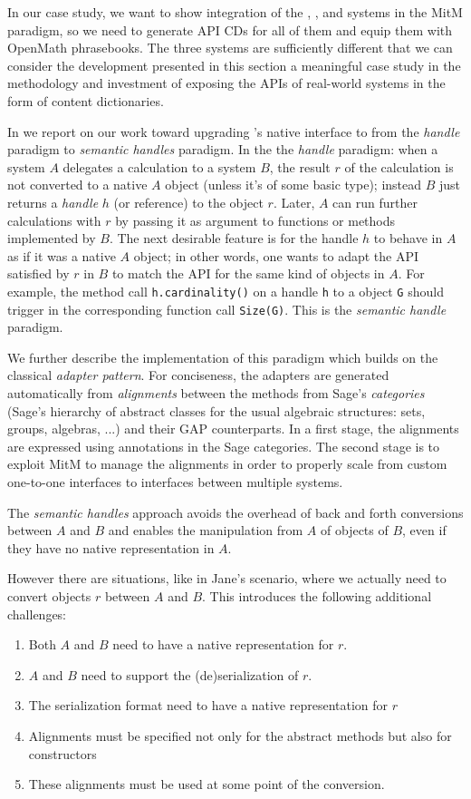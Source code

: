 In our case study, we want to show integration of the \GAP, \Singular, and \Sage systems
in the MitM paradigm, so we need to generate API CDs for all of them and equip them with
OpenMath phrasebooks. The three systems are sufficiently different that we can consider
the development presented in this section a meaningful case study in the methodology and
investment of exposing the APIs of real-world systems in the form of \OMMT content
dictionaries.

In \cite{DehKohKon:iop16} we report on our work toward upgrading
\Sage's native interface to \GAP from the \emph{handle} paradigm to
\emph{semantic handles} paradigm. In the the \emph{handle} paradigm:
when a system $A$ delegates a calculation to a system $B$, the result
$r$ of the calculation is not converted to a native $A$ object (unless
it's of some basic type);
instead $B$ just returns a \emph{handle} $h$ (or reference) to the
object $r$. Later, $A$ can run further calculations with $r$ by
passing it as argument to functions or methods implemented by $B$. The
next desirable feature is for the handle $h$ to behave in $A$ as if it
was a native $A$ object; in other words, one wants to adapt the API
satisfied by $r$ in $B$ to match the API for the same kind of objects
in $A$. For example, the method call \texttt{h.cardinality()} on a
\Sage handle \texttt{h} to a \GAP object \texttt{G} should trigger in
\GAP the corresponding function call \texttt{Size(G)}. This is the
\emph{semantic handle} paradigm.

We further describe the implementation of this paradigm which builds
on the classical \emph{adapter pattern}. For conciseness, the adapters
are generated automatically from \emph{alignments} between the methods
from Sage's \emph{categories} (Sage's hierarchy of abstract classes
for the usual algebraic structures: sets, groups, algebras, ...) and
their GAP counterparts. In a first stage, the alignments are expressed
using annotations in the Sage categories. The second stage is to
exploit MitM to manage the alignments in order to properly scale from
custom one-to-one interfaces to interfaces between multiple systems.

The \emph{semantic handles} approach avoids the overhead of back and
forth conversions between $A$ and $B$ and enables the manipulation
from $A$ of objects of $B$, even if they have no native representation
in $A$.

However there are situations, like in Jane's scenario, where we
actually need to convert objects $r$ between $A$ and $B$. This
introduces the following additional challenges:
\begin{enumerate}
\item Both $A$ and $B$ need to have a native representation for $r$.
\item $A$ and $B$ need to support the (de)serialization of $r$.
\item The serialization format need to have a native representation
  for $r$
\item Alignments must be specified not only for the abstract methods
  but also for constructors
\item These alignments must be used at some point of the conversion.
\end{enumerate}

